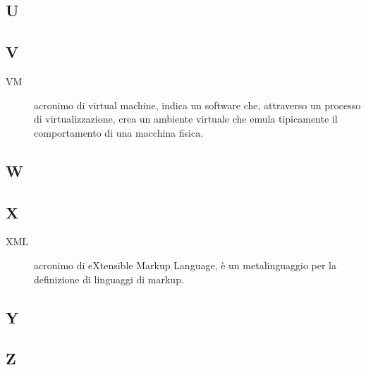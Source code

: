 \documentclass[../../../manuale.sviluppatore.tex]{subfiles}
\begin{document}
\subsection{U}

\subsection{V}

\begin{description}
    \item[VM] acronimo di virtual machine, indica un software che, attraverso un processo di virtualizzazione, crea un ambiente virtuale che emula tipicamente il comportamento di una macchina fisica.
\end{description}

\subsection{W}

\subsection{X}
\begin{description}
    \item[XML] acronimo di eXtensible Markup Language, è un metalinguaggio per la definizione di linguaggi di markup.
\end{description}

\subsection{Y}

\subsection{Z}
\end{document}
